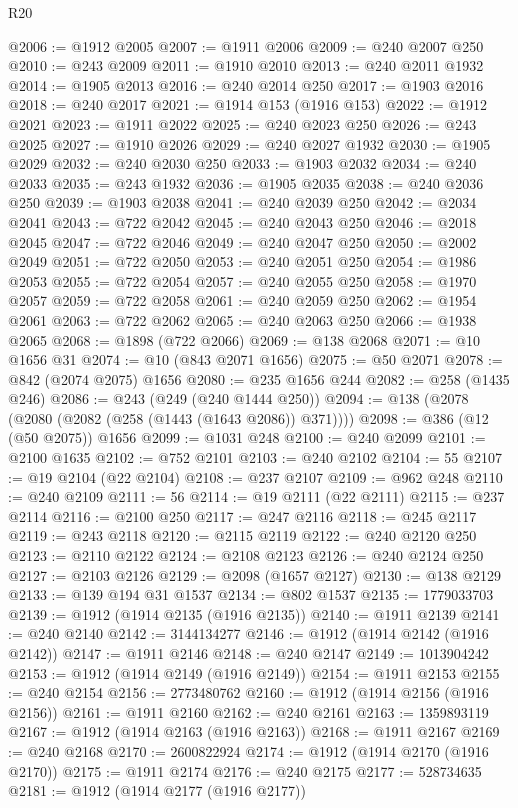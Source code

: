 \begin{lexlean}{R20}
\begin{coremodule}
{@2006 := @1912 @2005
@2007 := @1911 @2006
@2009 := @240 @2007 @250
@2010 := @243 @2009
@2011 := @1910 @2010
@2013 := @240 @2011 @1932
@2014 := @1905 @2013
@2016 := @240 @2014 @250
@2017 := @1903 @2016
@2018 := @240 @2017
@2021 := @1914 @153 (@1916 @153)
@2022 := @1912 @2021
@2023 := @1911 @2022
@2025 := @240 @2023 @250
@2026 := @243 @2025
@2027 := @1910 @2026
@2029 := @240 @2027 @1932
@2030 := @1905 @2029
@2032 := @240 @2030 @250
@2033 := @1903 @2032
@2034 := @240 @2033
@2035 := @243 @1932
@2036 := @1905 @2035
@2038 := @240 @2036 @250
@2039 := @1903 @2038
@2041 := @240 @2039 @250
@2042 := @2034 @2041
@2043 := @722 @2042
@2045 := @240 @2043 @250
@2046 := @2018 @2045
@2047 := @722 @2046
@2049 := @240 @2047 @250
@2050 := @2002 @2049
@2051 := @722 @2050
@2053 := @240 @2051 @250
@2054 := @1986 @2053
@2055 := @722 @2054
@2057 := @240 @2055 @250
@2058 := @1970 @2057
@2059 := @722 @2058
@2061 := @240 @2059 @250
@2062 := @1954 @2061
@2063 := @722 @2062
@2065 := @240 @2063 @250
@2066 := @1938 @2065
@2068 := @1898 (@722 @2066)
@2069 := @138 @2068
@2071 := @10 @1656 @31
@2074 := @10 (@843 @2071 @1656)
@2075 := @50 @2071
@2078 := @842 (@2074 @2075) @1656
@2080 := @235 @1656 @244
@2082 := @258 (@1435 @246)
@2086 := @243 (@249 (@240 @1444 @250))
@2094 := @138 (@2078 (@2080 (@2082 (@258 (@1443 (@1643 @2086)) @371))))
@2098 := @386 (@12 (@50 @2075)) @1656
@2099 := @1031 @248
@2100 := @240 @2099
@2101 := @2100 @1635
@2102 := @752 @2101
@2103 := @240 @2102
@2104 := 55
@2107 := @19 @2104 (@22 @2104)
@2108 := @237 @2107
@2109 := @962 @248
@2110 := @240 @2109
@2111 := 56
@2114 := @19 @2111 (@22 @2111)
@2115 := @237 @2114
@2116 := @2100 @250
@2117 := @247 @2116
@2118 := @245 @2117
@2119 := @243 @2118
@2120 := @2115 @2119
@2122 := @240 @2120 @250
@2123 := @2110 @2122
@2124 := @2108 @2123
@2126 := @240 @2124 @250
@2127 := @2103 @2126
@2129 := @2098 (@1657 @2127)
@2130 := @138 @2129
@2133 := @139 @194 @31 @1537
@2134 := @802 @1537
@2135 := 1779033703
@2139 := @1912 (@1914 @2135 (@1916 @2135))
@2140 := @1911 @2139
@2141 := @240 @2140
@2142 := 3144134277
@2146 := @1912 (@1914 @2142 (@1916 @2142))
@2147 := @1911 @2146
@2148 := @240 @2147
@2149 := 1013904242
@2153 := @1912 (@1914 @2149 (@1916 @2149))
@2154 := @1911 @2153
@2155 := @240 @2154
@2156 := 2773480762
@2160 := @1912 (@1914 @2156 (@1916 @2156))
@2161 := @1911 @2160
@2162 := @240 @2161
@2163 := 1359893119
@2167 := @1912 (@1914 @2163 (@1916 @2163))
@2168 := @1911 @2167
@2169 := @240 @2168
@2170 := 2600822924
@2174 := @1912 (@1914 @2170 (@1916 @2170))
@2175 := @1911 @2174
@2176 := @240 @2175
@2177 := 528734635
@2181 := @1912 (@1914 @2177 (@1916 @2177))
}
\end{coremodule}
\end{lexlean}
